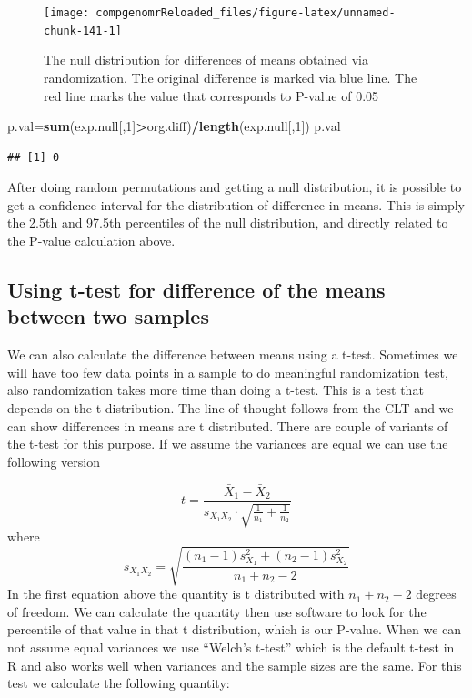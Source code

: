 \documentclass[12pt,]{krantz}
\newenvironment{Shaded}{\begin{snugshade}}{\end{snugshade}}
\newcommand{\DecValTok}[1]{\textcolor[rgb]{0.00,0.00,0.81}{#1}}
\newcommand{\KeywordTok}[1]{\textcolor[rgb]{0.13,0.29,0.53}{\textbf{#1}}}
\newcommand{\NormalTok}[1]{#1}
\newcommand{\OperatorTok}[1]{\textcolor[rgb]{0.81,0.36,0.00}{\textbf{#1}}}
\begin{document}
\begin{figure}

{\centering \texttt{[image: compgenomrReloaded\_files/figure-latex/unnamed-chunk-141-1]} 

}

\caption{The null distribution for differences of means obtained via randomization. The original difference is marked via blue line. The red line marks the value that corresponds to P-value of 0.05}\label{fig:unnamed-chunk-141}
\end{figure}

\begin{Shaded}
\begin{Highlighting}[]
\NormalTok{p.val=}\KeywordTok{sum}\NormalTok{(exp.null[,}\DecValTok{1}\NormalTok{]}\OperatorTok{>}\NormalTok{org.diff)}\OperatorTok{/}\KeywordTok{length}\NormalTok{(exp.null[,}\DecValTok{1}\NormalTok{])}
\NormalTok{p.val}
\end{Highlighting}
\end{Shaded}

\begin{verbatim}
## [1] 0
\end{verbatim}

After doing random permutations and getting a null distribution, it is possible to get a confidence interval for the distribution of difference in means.
This is simply the 2.5th and 97.5th percentiles of the null distribution, and
directly related to the P-value calculation above.

\hypertarget{using-t-test-for-difference-of-the-means-between-two-samples}{%
\subsection{Using t-test for difference of the means between two samples}\label{using-t-test-for-difference-of-the-means-between-two-samples}}

We can also calculate the difference between means using a t-test. Sometimes we will have too few data points in a sample to do meaningful
randomization test, also randomization takes more time than doing a t-test.
This is a test that depends on the t distribution. The line of thought follows
from the CLT and we can show differences in means are t distributed.
There are couple of variants of the t-test for this purpose. If we assume
the variances are equal we can use the following version

\[t = \frac{\bar {X}_1 - \bar{X}_2}{s_{X_1X_2} \cdot \sqrt{\frac{1}{n_1}+\frac{1}{n_2}}}\]
where
\[s_{X_1X_2} = \sqrt{\frac{(n_1-1)s_{X_1}^2+(n_2-1)s_{X_2}^2}{n_1+n_2-2}}\]
In the first equation above the quantity is t distributed with \(n_1+n_2-2\) degrees of freedom. We can calculate the quantity then use software
to look for the percentile of that value in that t distribution, which is our P-value. When we can not assume equal variances we use ``Welch's t-test''
which is the default t-test in R and also works well when variances and
the sample sizes are the same. For this test we calculate the following
quantity:
\end{document}
